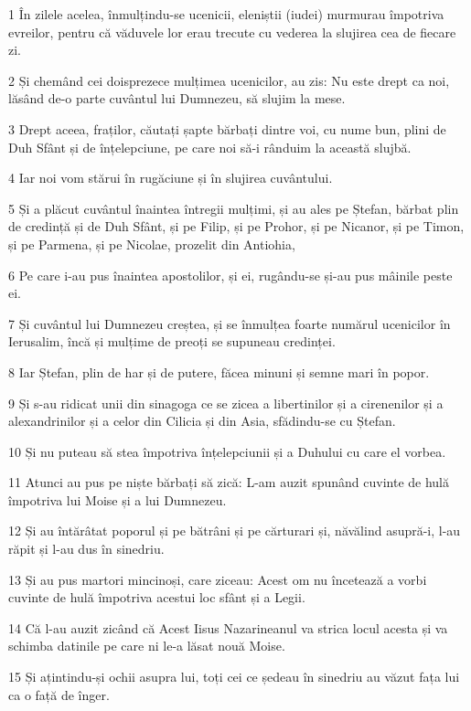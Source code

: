 \par 1 În zilele acelea, înmulțindu-se ucenicii, eleniștii (iudei) murmurau împotriva evreilor, pentru că văduvele lor erau trecute cu vederea la slujirea cea de fiecare zi.
\par 2 Și chemând cei doisprezece mulțimea ucenicilor, au zis: Nu este drept ca noi, lăsând de-o parte cuvântul lui Dumnezeu, să slujim la mese.
\par 3 Drept aceea, fraților, căutați șapte bărbați dintre voi, cu nume bun, plini de Duh Sfânt și de înțelepciune, pe care noi să-i rânduim la această slujbă.
\par 4 Iar noi vom stărui în rugăciune și în slujirea cuvântului.
\par 5 Și a plăcut cuvântul înaintea întregii mulțimi, și au ales pe Ștefan, bărbat plin de credință și de Duh Sfânt, și pe Filip, și pe Prohor, și pe Nicanor, și pe Timon, și pe Parmena, și pe Nicolae, prozelit din Antiohia,
\par 6 Pe care i-au pus înaintea apostolilor, și ei, rugându-se și-au pus mâinile peste ei.
\par 7 Și cuvântul lui Dumnezeu creștea, și se înmulțea foarte numărul ucenicilor în Ierusalim, încă și mulțime de preoți se supuneau credinței.
\par 8 Iar Ștefan, plin de har și de putere, făcea minuni și semne mari în popor.
\par 9 Și s-au ridicat unii din sinagoga ce se zicea a libertinilor și a cirenenilor și a alexandrinilor și a celor din Cilicia și din Asia, sfădindu-se cu Ștefan.
\par 10 Și nu puteau să stea împotriva înțelepciunii și a Duhului cu care el vorbea.
\par 11 Atunci au pus pe niște bărbați să zică: L-am auzit spunând cuvinte de hulă împotriva lui Moise și a lui Dumnezeu.
\par 12 Și au întărâtat poporul și pe bătrâni și pe cărturari și, năvălind asupră-i, l-au răpit și l-au dus în sinedriu.
\par 13 Și au pus martori mincinoși, care ziceau: Acest om nu încetează a vorbi cuvinte de hulă împotriva acestui loc sfânt și a Legii.
\par 14 Că l-au auzit zicând că Acest Iisus Nazarineanul va strica locul acesta și va schimba datinile pe care ni le-a lăsat nouă Moise.
\par 15 Și ațintindu-și ochii asupra lui, toți cei ce ședeau în sinedriu au văzut fața lui ca o față de înger.

